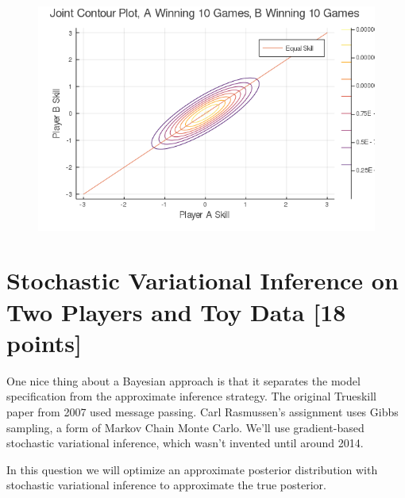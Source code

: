 \documentclass{article}
\begin{document}
\begin{enumerate}[label=(\alph*)]
\begin{figure}[h]
  \centering
  \includegraphics[width=12cm,keepaspectratio]{plots/joint_contour_A10_B10.png}
\end{figure}

\end{enumerate}

\pagebreak
\section{Stochastic Variational Inference on Two Players and Toy Data [18 points]}

One nice thing about a Bayesian approach is that it separates the model specification from the approximate inference strategy.
The original Trueskill paper from 2007 used message passing.
Carl Rasmussen's assignment uses Gibbs sampling, a form of Markov Chain Monte Carlo.
We'll use gradient-based stochastic variational inference, which wasn't invented until around 2014. 

In this question we will optimize an approximate posterior distribution with
stochastic variational inference to approximate the true posterior.
\end{document}
